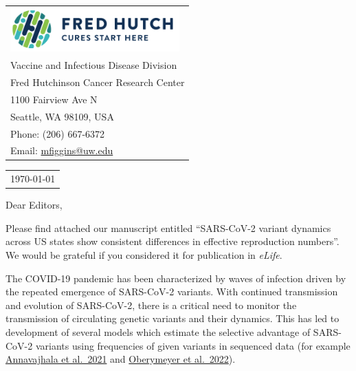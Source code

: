 \documentclass[11pt]{article}
\begin{document}
\thispagestyle{empty} %

\mbox{}\hfill
\begin{tabular}{l @{}}
	\includegraphics[width=6.5cm]{figures/fhcrc_logo} \\
	Vaccine and Infectious Disease Division \\
	Fred Hutchinson Cancer Research Center \\
	1100 Fairview Ave N \\
	Seattle, WA 98109, USA \\
	Phone: (206) 667-6372 \\
	Email: \href{mailto:mfiggins@uw.edu}{mfiggins@uw.edu} \\
\end{tabular}

\vspace{0.1in} %

\begin{tabular}{@{} l}
  \today
\end{tabular}

\vspace{0.1in} %

Dear Editors,

\medskip %

Please find attached our manuscript entitled ``SARS-CoV-2 variant dynamics across US states show consistent differences in effective reproduction numbers''.
We would be grateful if you considered it for publication in \textit{eLife}.

The COVID-19 pandemic has been characterized by waves of infection driven by the repeated emergence of SARS-CoV-2 variants.
With continued transmission and evolution of SARS-CoV-2, there is a critical need to monitor the transmission of circulating genetic variants and their dynamics.
This has led to development of several models which estimate the selective advantage of SARS-CoV-2 variants using frequencies of given variants in sequenced data (for example \href{https://www.nature.com/articles/s41586-021-03908-2}{Annavajhala et al.\ 2021} and \href{https://www.science.org/doi/10.1126/science.abm1208}{Oberymeyer et al.\ 2022}).
\end{document}
